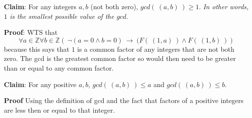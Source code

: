 
{\bf Claim}: For any integers $a,b$ (not both zero), $gcd(~(a,b)~) \geq 1$.
{\it In other words, $1$ is the smallest possible value of the $gcd$}.

{\bf Proof}: WTS that 
\[
    \forall a \in \mathbb{Z} \forall b \in \mathbb{Z} \left( ~\lnot ( a = 0 \land b = 0)~ \to 
    ~(F(~(1,a)~) \land F(~(1,b)~) \right)
\]
because this says that $1$ is a common factor of any integers that are not both zero. The gcd 
is the greatest common factor so would then need to be greater than or equal to any common factor.

\vspace{250pt}

{\bf Claim}: For any positive $a,b$, $gcd(~(a,b)~) \leq a$ and $gcd( ~(a,b)~) \leq b$.

{\bf Proof} Using the definition of gcd and the fact that factors of a positive integers
are less then or equal to that integer.

\vspace{50pt}